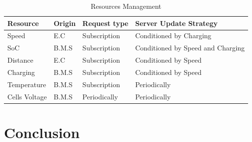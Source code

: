 \documentclass[runningheads]{llncs}
\begin{document}
\begin{table}
\caption{Resources Management}\label{tab1}
\begin{tabular}{|l|l|l|l|}
\hline
Resource & Origin  & Request type & Server Update Strategy\\
\hline

Speed &  { E.C } & Subscription & Conditioned by Charging \\
SoC  & { B.M.S} & Subscription& Conditioned by Speed and Charging\\
Distance & { E.C } & Subscription & Conditioned by Speed\\
Charging & { B.M.S}  & Subscription & Conditioned by Speed\\
Temperature & { B.M.S}  & Subscription & Periodically \\
Cells Voltage & { B.M.S}  & Periodically & Periodically \\
\hline
\end{tabular}
\label{tab:data}
\end{table}

\paragraph{}
\paragraph{}
\paragraph{}

\section{Conclusion}
\paragraph{}
\paragraph{}




\end{document}
